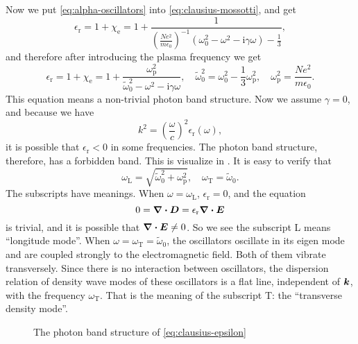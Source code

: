\documentclass[hyperref, a4paper]{article}
\newcommand*{\ii}{\mathrm{i}}
\begin{document}
Now we put \eqref{eq:alpha-oscillators} into \eqref{eq:clausius-mossotti}, and get 
\[
    \epsilon_\text{r} = 1 + \chi_\text{e} = 1 + \frac{1}{\left(\frac{N e^2}{m \epsilon_0}\right)^{-1} (\omega_0^2 - \omega^2 - \ii \gamma \omega) - \frac{1}{3}}, 
\]
and therefore after introducing the plasma frequency we get 
\begin{equation}
    \epsilon_\text{r} = 1 + \chi_\text{e} = 1 + \frac{\omega_\text{p}^2}{\tilde{\omega}_0^2 - \omega^2 - \ii \gamma \omega}, \quad \tilde{\omega}_0^2 = \omega_0^2 - \frac{1}{3} \omega_\text{p}^2, \quad \omega_\text{p}^2 = \frac{N e^2}{m \epsilon_0}.
    \label{eq:clausius-epsilon}
\end{equation}
This equation means a non-trivial photon band structure. Now we assume $\gamma = 0$, and because we have 
\begin{equation}
    k^2 = \left(\frac{\omega}{c}\right)^2 \epsilon_\text{r}(\omega),
\end{equation}
it is possible that $\epsilon_\text{r} < 0$ in some frequencies. The photon band structure, therefore, has 
a forbidden band. This is visualize in . It is easy to verify that 
\begin{equation}
    \omega_\text{L} = \sqrt{\tilde{\omega}_0^2 + \omega_\text{p}^2}, \quad \omega_\text{T} = \tilde{\omega}_0.
\end{equation}
The subscripts have meanings. When $\omega = \omega_\text{L}$, $\epsilon_\text{r} = 0$, and the equation
\[
    0 = \div{\vb*{D}} = \epsilon_\text{r} \div{\vb*{E}}
\]
is trivial, and it is possible that $\div{\vb*{E}} \neq 0$. So we see the subscript L means ``longitude mode''.
When $\omega = \omega_\text{T} = \tilde{\omega}_0$, the oscillators oscillate in its eigen mode and are coupled 
strongly to the electromagnetic field. Both of them vibrate transversely. Since there is no interaction between 
oscillators, the dispersion relation of density wave modes of these oscillators is a flat line, independent of 
$\vb*{k}$, with the frequency $\omega_\text{T}$. That is the meaning of the subscript T: the ``transverse density mode''.

\begin{figure}
    \centering
    
    \caption{The photon band structure of \eqref{eq:clausius-epsilon}}
    \label{fig:clausius-epsilon}
\end{figure}
\end{document}
